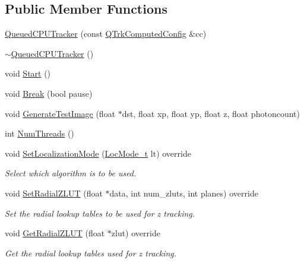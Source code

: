 \subsection*{Public Member Functions}
\begin{DoxyCompactItemize}
\item 
\hyperlink{class_queued_c_p_u_tracker_a596570348d7ddc545c3823a10ac21c56}{Queued\+C\+P\+U\+Tracker} (const \hyperlink{struct_q_trk_computed_config}{Q\+Trk\+Computed\+Config} \&cc)
\item 
\hyperlink{class_queued_c_p_u_tracker_a27569181cf04bf0872aadd72a0c5560a}{$\sim$\+Queued\+C\+P\+U\+Tracker} ()
\item 
void \hyperlink{class_queued_c_p_u_tracker_a1094604fc95b81cd43327606001d84ec}{Start} ()
\item 
void \hyperlink{class_queued_c_p_u_tracker_a3ae7b15c688e8a632ff10a0a5b8ccdd0}{Break} (bool pause)
\item 
void \hyperlink{class_queued_c_p_u_tracker_a0901736328051388ed2dceb94a3b378f}{Generate\+Test\+Image} (float $\ast$dst, float xp, float yp, float z, float photoncount)
\item 
int \hyperlink{class_queued_c_p_u_tracker_ab72dd2ac1e12de11115f1cd96c9e51cd}{Num\+Threads} ()
\item 
void \hyperlink{class_queued_c_p_u_tracker_a7fcc061bd8d6a0f16472d57c8939c565}{Set\+Localization\+Mode} (\hyperlink{qtrk__c__api_8h_a6ba72ec1daa19642f85a47defe8f0812}{Loc\+Mode\+\_\+t} lt) override
\begin{DoxyCompactList}\small\item\em Select which algorithm is to be used. \end{DoxyCompactList}\item 
void \hyperlink{class_queued_c_p_u_tracker_af9ac36a1eb757e006698a4fb789bcbd0}{Set\+Radial\+Z\+L\+UT} (float $\ast$data, int num\+\_\+zluts, int planes) override
\begin{DoxyCompactList}\small\item\em Set the radial lookup tables to be used for z tracking. \end{DoxyCompactList}\item 
void \hyperlink{class_queued_c_p_u_tracker_a9c4f1687ca9347508594a9df46defad8}{Get\+Radial\+Z\+L\+UT} (float $\ast$zlut) override
\begin{DoxyCompactList}\small\item\em Get the radial lookup tables used for z tracking. \end{DoxyCompactList}\item 

\end{DoxyCompactItemize}
